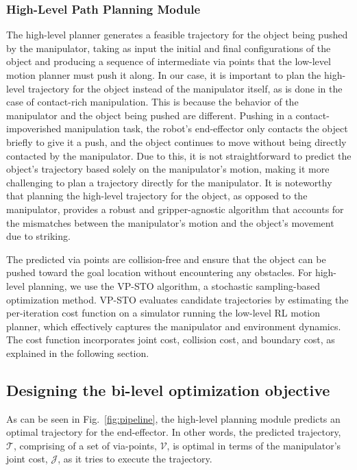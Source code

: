\subsubsection{High-Level Path Planning Module}
\label{sec:path-planning-module}
The high-level planner generates a feasible trajectory for the object being pushed by the manipulator, taking as input the initial and final configurations of the object and producing a sequence of intermediate via points that the low-level motion planner must push it along. In our case, it is important to plan the high-level trajectory for the object instead of the manipulator itself, as is done in the case of contact-rich manipulation. This is because the behavior of the manipulator and the object being pushed are different. Pushing in a contact-impoverished manipulation task, the robot's end-effector only contacts the object briefly to give it a push, and the object continues to move without being directly contacted by the manipulator. Due to this, it is not straightforward to predict the object's trajectory based solely on the manipulator's motion, making it more challenging to plan a trajectory directly for the manipulator. It is noteworthy that planning the high-level trajectory for the object, as opposed to the manipulator, provides a robust and gripper-agnostic algorithm that accounts for the mismatches between the manipulator's motion and the object's movement due to striking.

The predicted via points are collision-free and ensure that the object can be pushed toward the goal location without encountering any obstacles. For high-level planning, we use the VP-STO algorithm, a stochastic sampling-based optimization method. VP-STO evaluates candidate trajectories by estimating the per-iteration cost function on a simulator running the low-level RL motion planner, which effectively captures the manipulator and environment dynamics. The cost function incorporates joint cost, collision cost, and boundary cost, as explained in the following section.

\subsection{Designing the bi-level optimization objective}

As can be seen in Fig.~\ref{fig:pipeline}, the high-level planning module predicts an optimal trajectory for the end-effector. In other words, the predicted trajectory, $\mathcal{T}$, comprising of a set of via-points, $\mathcal{V}$, is optimal in terms of the manipulator's joint cost, $\mathcal{J}$, as it tries to execute the trajectory. 

